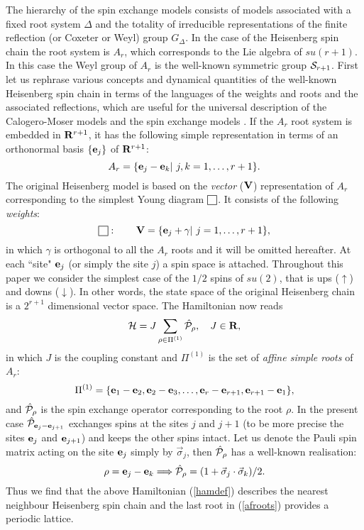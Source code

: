 \documentclass[a4paper,12pt]{article}
\def\sqr#1#2{{\vcenter{\hrule height.#2pt
      \hbox{\vrule width.#2pt height#1pt \kern#1pt
          \vrule width.#2pt}
      \hrule height.#2pt}}}
\begin{document}
The hierarchy of the spin exchange models \cite{is1} consists of models
associated with a fixed root system $\Delta$ and the totality of irreducible
representations %
of the finite reflection (or Coxeter or Weyl) group
$G_\Delta$.
In the case of the Heisenberg spin chain the root system is
$A_r$, which corresponds
to the Lie algebra of $su(r+1)$. In this case the Weyl group of $A_r$ is the
well-known symmetric group ${\cal S}_{r+1}$.
First let us rephrase  various concepts and dynamical
quantities of the well-known
Heisenberg spin chain in terms of the languages of the
weights and roots and the
associated reflections, which are useful for the universal description of
the
Calogero-Moser models \cite{OP1,DHoker_Phong,bcs2,bms} and the spin exchange
models \cite{is1}.
If the
$A_r$ root system is embedded in
${\bf R}^{r+1}$, it has the following simple representation in terms of an
orthonormal   basis $\{{\bf e}_j\}$ of ${\bf R}^{r+1}$:
\begin{equation}
A_r=\{{\bf e}_j-{\bf e}_k|\  j,k=1,\ldots,r+1\}.
\end{equation}
The original Heisenberg model is based on the
{\em vector} (${\bf V}$) representation of $A_r$
corresponding to the simplest Young
diagram
$\sqr{9}5$. It consists of the following {\em weights\/}:
\begin{equation}
\sqr{9}5:\qquad {\bf V}=\{{\bf e}_j+\gamma|\  j=1,\ldots,r+1\},
\label{vecwei}
\end{equation}
in which $\gamma$ is orthogonal to all the $A_r$ roots and it will be
omitted
hereafter.
At each  ``site" ${\bf e}_j$ (or simply the site $j$)
a spin space is attached.
Throughout this paper we consider the simplest case of
the $1/2$ spins of $su(2)$,
that is ups ($\uparrow$)  and downs ($\downarrow$).
In other words, the state space of the original
Heisenberg chain is a $2^{r+1}$
dimensional vector space.
The Hamiltonian now reads
\begin{equation}
{\cal H}=J\sum_{\rho\in\Pi^{(1)}}\hat{\cal P}_\rho,\quad J\in{\bf R},
\label{hamdef}
\end{equation}
in which $J$ is the coupling constant and $\Pi^{(1)}$
is the set of {\em affine
simple roots\/} of $A_r$:
\begin{equation}
\Pi^{(1)}=\{{\bf e}_1-{\bf e}_2,{\bf e}_2-{\bf e}_3,\ldots,
{\bf e}_r-{\bf e}_{r+1},
{\bf e}_{r+1}-{\bf e}_1\},
\label{afroots}
\end{equation}
and $\hat{\cal P}_\rho$ is the spin exchange operator
corresponding to the root
$\rho$.
In the present case $\hat{\cal P}_{{\bf e}_j-{\bf e}_{j+1}}$
exchanges spins at the
sites $j$ and $j+1$ (to be more precise the sites ${\bf e}_j$ and
${\bf e}_{j+1}$)
and keeps the other spins intact. Let us denote the Pauli spin
matrix acting on the
site ${\bf e}_j$ simply by $\vec{\sigma}_j$, then  $\hat{\cal P}_\rho$ has a
well-known realisation:
\begin{equation}
\rho={\bf e}_j-{\bf e}_k\Longrightarrow
\hat{\cal P}_\rho=(1+\vec{\sigma}_j\cdot\vec{\sigma}_k)/2.
\label{Pdef1}
\end{equation}
Thus we find that the above Hamiltonian  (\ref{hamdef}) describes the
nearest
neighbour Heisenberg spin chain and the last root in (\ref{afroots})
provides
a periodic lattice.
\end{document}
